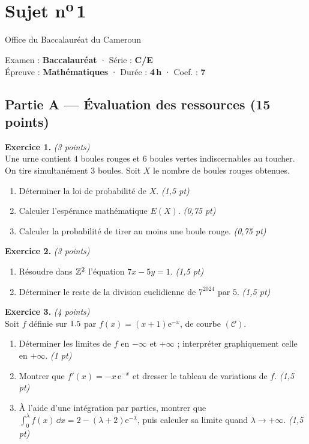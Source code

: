 \section{Sujet n\textsuperscript{o}\,1}
\noindent\begin{minipage}{0.5\linewidth}\footnotesize Office du Baccalauréat du Cameroun\end{minipage}%
\hfill\begin{minipage}{0.45\linewidth}\footnotesize\raggedleft Examen : \textbf{Baccalauréat} · Série : \textbf{C/E}\\
Épreuve : \textbf{Mathématiques} · Durée : \textbf{4\,h} · Coef. : \textbf{7}\end{minipage}
\par\smallskip{\color{onbo}\rule{\linewidth}{1pt}}

\subsection*{Partie A — Évaluation des ressources \hfill (15 points)}

\noindent\textbf{Exercice 1.} \hfill\textit{(3 points)}\\
Une urne contient $4$ boules rouges et $6$ boules vertes indiscernables au toucher. On
tire simultanément $3$ boules. Soit $X$ le nombre de boules rouges obtenues.
\begin{enumerate}[label=\arabic*)]
\item Déterminer la loi de probabilité de $X$. \hfill\textit{(1,5 pt)}
\item Calculer l'espérance mathématique $E(X)$. \hfill\textit{(0,75 pt)}
\item Calculer la probabilité de tirer au moins une boule rouge. \hfill\textit{(0,75 pt)}
\end{enumerate}

\smallskip
\noindent\textbf{Exercice 2.} \hfill\textit{(3 points)}\\
\begin{enumerate}[label=\arabic*)]
\item Résoudre dans $\mathbb{Z}^2$ l'équation $7x-5y=1$. \hfill\textit{(1,5 pt)}
\item Déterminer le reste de la division euclidienne de $7^{2024}$ par $5$. \hfill\textit{(1,5 pt)}
\end{enumerate}

\smallskip
\noindent\textbf{Exercice 3.} \hfill\textit{(4 points)}\\
Soit $f$ définie sur $1.5$ par $f(x)=(x+1)\mathrm{e}^{-x}$, de courbe $(\mathcal{C})$.
\begin{enumerate}[label=\arabic*)]
\item Déterminer les limites de $f$ en $-\infty$ et $+\infty$ ; interpréter graphiquement celle en $+\infty$. \hfill\textit{(1 pt)}
\item Montrer que $f'(x)=-x\,\mathrm{e}^{-x}$ et dresser le tableau de variations de $f$. \hfill\textit{(1,5 pt)}
\item À l'aide d'une intégration par parties, montrer que $\displaystyle\int_0^{\lambda}f(x)\,\dd x=2-(\lambda+2)\mathrm{e}^{-\lambda}$,
puis calculer sa limite quand $\lambda\to+\infty$. \hfill\textit{(1,5 pt)}
\end{enumerate}

